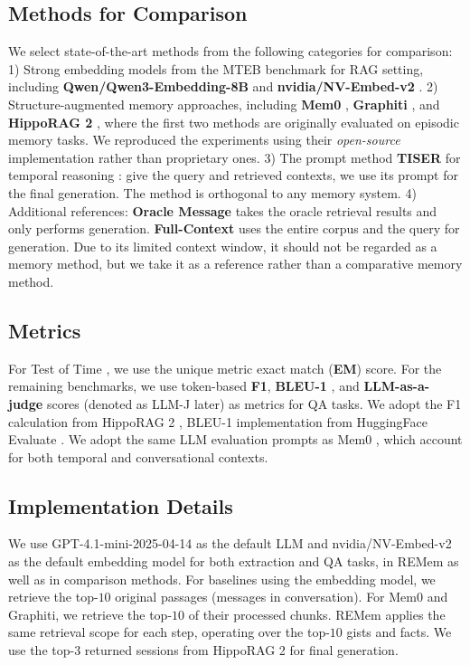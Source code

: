 \documentclass{article} %
\newcommand{\ours}{REMem\xspace}
\begin{document}
\subsection{Methods for Comparison}

We select state-of-the-art methods from the following categories for comparison:
1) Strong embedding models from the MTEB benchmark \citep{mteb} for RAG setting, including \textbf{Qwen/Qwen3-Embedding-8B} \citep{qwen3embedding} and \textbf{nvidia/NV-Embed-v2} \citep{nvembed}.
2) Structure-augmented memory approaches, including \textbf{Mem0} \citep{mem0}, \textbf{Graphiti} \citep{zep}, and \textbf{HippoRAG 2} \citep{hipporag2}, where the first two methods are originally evaluated on episodic memory tasks.
We reproduced the experiments using their \textit{open-source} implementation rather than proprietary ones.
3) The prompt method \textbf{TISER} for temporal reasoning  \citep{tiser}: give the query and retrieved contexts, we use its prompt for the final generation. 
The method is orthogonal to any memory system.
4) Additional references: \textbf{Oracle Message} takes the oracle retrieval results and only performs generation.
\textbf{Full-Context} uses the entire corpus and the query for generation.
Due to its limited context window, it should not be regarded as a memory method, but we take it as a reference rather than a comparative memory method.

\subsection{Metrics}
\label{subsec:metrics}

For Test of Time \citep{tot}, we use the unique metric exact match (\textbf{EM}) score.
For the remaining benchmarks, we use token-based \textbf{F1}, \textbf{BLEU-1} \citep{bleu}, and \textbf{LLM-as-a-judge} scores (denoted as LLM-J later) as metrics for QA tasks.
We adopt the F1 calculation from HippoRAG 2 \citep{hipporag2}, BLEU-1 implementation from HuggingFace Evaluate \citep{hf_evaluate}. 
We adopt the same LLM evaluation prompts as Mem0 \citep{mem0}, which account for both temporal and conversational contexts.

\subsection{Implementation Details}
\label{subsec:implementation-details}

We use GPT-4.1-mini-2025-04-14 \citep{openai_gpt4_1_mini} as the default LLM and nvidia/NV-Embed-v2 \citep{nvembed} as the default embedding model for both extraction and QA tasks, in \ours as well as in comparison methods.
For baselines using the embedding model, we retrieve the top-$10$ original passages (messages in conversation).
For Mem0 and Graphiti, we retrieve the top-$10$ of their processed chunks.
\ours applies the same retrieval scope for each step, operating over the top-$10$ gists and facts.
We use the top-$3$ returned sessions from HippoRAG 2 for final generation.
\end{document}
